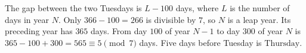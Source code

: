 The gap between the two Tuesdays is $L-100$ days, where $L$ is the number of days in year $N$. Only $366-100=266$ is divisible by $7$, so $N$ is a leap year. Its preceding year has $365$ days. From day $100$ of year $N-1$ to day $300$ of year $N$ is $365-100+300=565\equiv 5\pmod 7$ days. Five days before Tuesday is $\boxed{\text{Thursday}}$.
